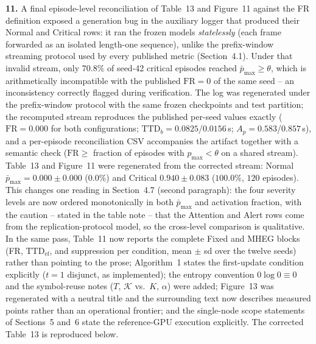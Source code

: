 \documentclass[1p,12pt,authoryear]{elsarticle}
\begin{document}
\vspace{2mm}
\noindent \textbf{11.} A final episode-level reconciliation of Table~13 and Figure~11 against the FR definition exposed a generation bug in the auxiliary logger that produced their Normal and Critical rows: it ran the frozen models \emph{statelessly} (each frame forwarded as an isolated length-one sequence), unlike the prefix-window streaming protocol used by every published metric (Section~4.1). Under that invalid stream, only $70.8\%$ of seed-42 critical episodes reached $\bar{p}_{\max} \ge \theta$, which is arithmetically incompatible with the published $\mathrm{FR}=0$ of the same seed -- an inconsistency correctly flagged during verification. The log was regenerated under the prefix-window protocol with the same frozen checkpoints and test partition; the recomputed stream reproduces the published per-seed values exactly ($\mathrm{FR}=0.000$ for both configurations; $\mathrm{TTD}_b = 0.0825$/$0.0156$\,s; $A_p = 0.583$/$0.857$\,s), and a per-episode reconciliation CSV accompanies the artifact together with a semantic check ($\mathrm{FR} \ge$ fraction of episodes with $p_{\max} < \theta$ on a shared stream). Table~13 and Figure~11 were regenerated from the corrected stream: Normal $\bar{p}_{\max} = 0.000 \pm 0.000$ ($0.0\%$) and Critical $0.940 \pm 0.083$ ($100.0\%$, $120$ episodes). This changes one reading in Section~4.7 (second paragraph): the four severity levels are now ordered monotonically in both $\bar{p}_{\max}$ and activation fraction, with the caution -- stated in the table note -- that the Attention and Alert rows come from the replication-protocol model, so the cross-level comparison is qualitative. In the same pass, Table~11 now reports the complete Fixed and MHEG blocks (FR, $\mathrm{TTD}_{\mathrm{ef}}$, and suppression per condition, mean $\pm$ sd over the twelve seeds) rather than pointing to the prose; Algorithm~1 states the first-update condition explicitly ($t{=}1$ disjunct, as implemented); the entropy convention $0\log 0 \equiv 0$ and the symbol-reuse notes ($T$, $\mathcal{K}$ vs.\ $K$, $\alpha$) were added; Figure~13 was regenerated with a neutral title and the surrounding text now describes measured points rather than an operational frontier; and the single-node scope statements of Sections~5 and~6 state the reference-GPU execution explicitly. The corrected Table~13 is reproduced below.
\end{document}

